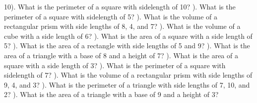 \documentclass{article}%
\begin{document}
10). What is the perimeter of a square with sidelength of 10?%
\newline%
\newline%
). What is the perimeter of a square with sidelength of 5?%
\newline%
\newline%
). What is the volume of a rectangular prism with side lengths of 8, 4, and 7?%
\newline%
\newline%
). What is the volume of a cube with a side length of 6?%
\newline%
\newline%
). What is the area of a square with a side length of 5?%
\newline%
\newline%
). What is the area of a rectangle with side lengths of 5 and 9?%
\newline%
\newline%
). What is the area of a triangle with a base of 8 and a height of 7?%
\newline%
\newline%
). What is the area of a square with a side length of 3?%
\newline%
\newline%
). What is the perimeter of a square with sidelength of 7?%
\newline%
\newline%
). What is the volume of a rectangular prism with side lengths of 9, 4, and 3?%
\newline%
\newline%
). What is the perimeter of a triangle with side lengths of 7, 10, and 2?%
\newline%
\newline%
). What is the area of a triangle with a base of 9 and a height of 3?%
\newline%
\newline%
\newline%
\end{document}
